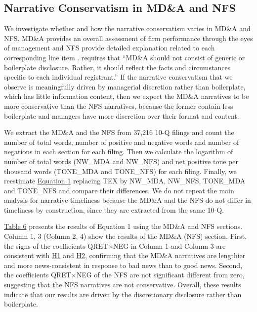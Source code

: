 \documentclass[letterpaper,11pt]{article}
\begin{document}
\begin{spacing}{1.5}
\subsection{Narrative Conservatism in MD\&A and NFS}
We investigate whether and how the narrative conservatism varies in MD\&A and NFS. MD\&A provides an overall assessment of firm performance through the eyes of management and NFS provide detailed explanation related to each corresponding line item \cite{fasbConceptualFrameworkFinancial2018a, secFinancialReportingManual2019}.  requires that ``MD\&A should not consist of generic or boilerplate disclosure. Rather, it should reflect the facts and circumstances specific to each individual registrant.'' If the narrative conservatism that we observe is meaningfully driven by managerial discretion rather than boilerplate, which has little information content, then we expect the MD\&A narratives to be more conservative than the NFS narratives, because the former contain less boilerplate and managers have more discretion over their format and content.

We extract the MD\&A and the NFS from 37,216 10-Q filings and count the number of total words, number of positive and negative words and number of negations in each section for each filing. Then we calculate the logarithm of number of total words (NW\_MDA and NW\_NFS) and net positive tone per thousand words (TONE\_MDA and TONE\_NFS) for each filing. Finally, we reestimate \hyperref[eq1]{Equation 1} replacing TEX by NW\_MDA, NW\_NFS, TONE\_MDA and TONE\_NFS and compare their differences. We do not repeat the main analysis for narrative timeliness because the MD\&A and the NFS do not differ in timeliness by construction, since they are extracted from the same 10-Q.

\hyperref[T6]{Table 6} presents the results of Equation 1 using the MD\&A and NFS sections. Column 1, 3 (Column 2, 4) show the results of the MD\&A (NFS) section. First, the signs of the coefficients QRET$\times$NEG in Column 1 and Column 3 are consistent with \hyperref[h1]{H1} and \hyperref[h2]{H2}, confirming that the MD\&A narratives are lengthier and more news-consistent in response to bad news than to good news. Second, the coefficients QRET$\times$NEG of the NFS are not significant different from zero, suggesting that the NFS narratives are not conservative. Overall, these results indicate that our results are driven by the discretionary disclosure rather than boilerplate.


\end{spacing}
\end{document}
